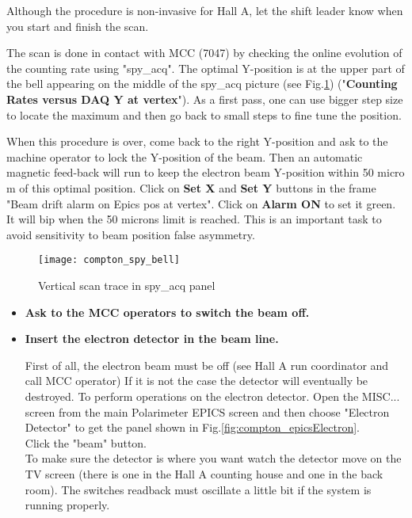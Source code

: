 {{Although the procedure is non-invasive for Hall A, let the shift leader know
when you start and finish the scan.

The scan is done in contact with MCC (7047) by checking the online evolution
        of the counting rate using "spy\_acq".
        The optimal Y-position is at the upper part of the bell appearing
        on the middle of the spy\_acq picture (see Fig.\ref{fig:compton_spy_bell}) 
	("{\bf Counting Rates versus DAQ Y
        at vertex}"). As a first pass, one can use bigger step size to locate
        the maximum and then go back to small steps to fine tune the position.

When this procedure is over, come back to the right Y-position and
        ask to the machine operator to lock the Y-position of the beam. Then an
        automatic magnetic feed-back will run to keep the electron beam Y-position
        within 50 micro m of this optimal position. Click on {\bf Set X} and
        {\bf Set Y} buttons in the frame "Beam drift alarm on Epics pos at vertex".
        Click on {\bf Alarm ON} to set it green. It will bip when the 50 microns limit
        is reached. This is an important task to avoid sensitivity to beam position
        false asymmetry.
\begin{figure}[htp]
    \begin{center}
        \texttt{[image: compton\_spy\_bell]}
    \end{center}
       \caption[compton:vertical scan]{Vertical scan trace in spy\_acq panel}
        \label{fig:compton_spy_bell}
\end{figure}

\begin{itemize}
\item {\bf Ask to the MCC operators to switch the beam off.}


\item {\bf Insert the electron detector in the beam line.}

First of all, the electron beam must
be off (see Hall A run coordinator and call MCC operator)
If it is not the case the detector will eventually be destroyed.
To perform operations on the electron detector. Open the MISC... screen from 
the main Polarimeter EPICS screen
and then choose "Electron Detector" to get the panel shown in 
Fig.\ref{fig:compton_epicsElectron}.\\

Click the "beam" button.\\
To make sure the detector is where you want watch the detector move on the TV screen (there is one
in the Hall A counting house and one in the back room). The switches readback must oscillate a
little bit if the system is running properly.


\end{itemize}}}
